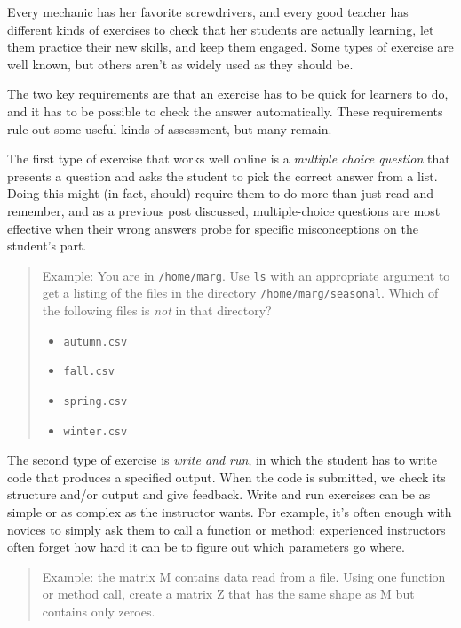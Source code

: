 \documentclass[10pt,statementpaper]{memoir}
\providecommand{\tightlist}{%
  \setlength{\itemsep}{0pt}\setlength{\parskip}{0pt}}
\begin{document}
Every mechanic has her favorite screwdrivers, and every good teacher has
different kinds of exercises to check that her students are actually
learning, let them practice their new skills, and keep them engaged.
Some types of exercise are well known, but others aren't as widely used
as they should be.

The two key requirements are that an exercise has to be quick for
learners to do, and it has to be possible to check the answer
automatically. These requirements rule out some useful kinds of
assessment, but many remain.

The first type of exercise that works well online is a \emph{multiple
choice question} that presents a question and asks the student to pick
the correct answer from a list. Doing this might (in fact, should)
require them to do more than just read and remember, and as a previous
post discussed, multiple-choice questions are most effective when their
wrong answers probe for specific misconceptions on the student's part.

\begin{quote}
Example: You are in \texttt{/home/marg}. Use \texttt{ls} with an
appropriate argument to get a listing of the files in the directory
\texttt{/home/marg/seasonal}. Which of the following files is \emph{not}
in that directory?

\begin{itemize}
\tightlist
\item
  \texttt{autumn.csv}
\item
  \texttt{fall.csv}
\item
  \texttt{spring.csv}
\item
  \texttt{winter.csv}
\end{itemize}
\end{quote}

The second type of exercise is \emph{write and run}, in which the
student has to write code that produces a specified output. When the
code is submitted, we check its structure and/or output and give
feedback. Write and run exercises can be as simple or as complex as the
instructor wants. For example, it's often enough with novices to simply
ask them to call a function or method: experienced instructors often
forget how hard it can be to figure out which parameters go where.

\begin{quote}
Example: the matrix M contains data read from a file. Using one function
or method call, create a matrix Z that has the same shape as M but
contains only zeroes.
\end{quote}
\end{document}
